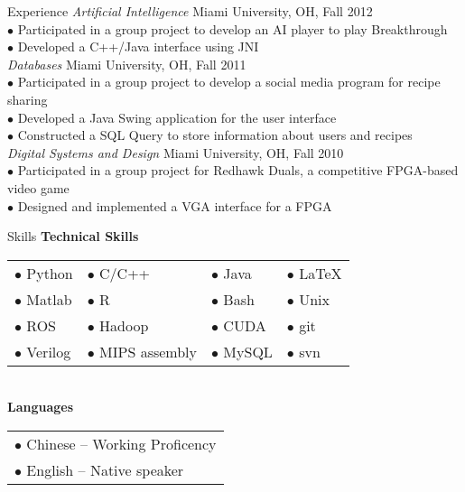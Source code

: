 \documentclass{resume} %
\begin{document}
\begin{rSection}{Experience}
  \textit{Artificial Intelligence} \hfill Miami University, OH, Fall 2012\\
  $\bullet$ Participated in a group project to develop an AI player to play Breakthrough\\
  $\bullet$ Developed a C++/Java interface using JNI\\ 
  \textit{Databases} \hfill Miami University, OH, Fall 2011\\
  $\bullet$ Participated in a group project to develop a social media program for recipe sharing \\
  $\bullet$ Developed a Java Swing application for the user interface \\
  $\bullet$ Constructed a SQL Query to store information about users and recipes\\[1 mm]
  \textit{Digital Systems and Design} \hfill Miami University, OH, Fall 2010\\
  $\bullet$ Participated in a group project for Redhawk Duals, a competitive FPGA-based video game\\
  $\bullet$ Designed and implemented a VGA interface for a FPGA\newpage
\end{rSection}
\begin{rSection}{Skills}
  \textbf{Technical Skills}\\[1 mm]
  \begin{tabular}{llll}
     $\bullet$ Python   &  $\bullet$ C/C++         &  $\bullet$ Java   &   $\bullet$ \LaTeX\\
     $\bullet$ Matlab   &  $\bullet$ R             &  $\bullet$ Bash   &   $\bullet$ Unix \\ 
     $\bullet$ ROS      &  $\bullet$ Hadoop        &  $\bullet$ CUDA   &   $\bullet$ git\\
     $\bullet$ Verilog  &  $\bullet$ MIPS assembly &  $\bullet$ MySQL  &   $\bullet$ svn\\
  \end{tabular}\\[1 mm]
  \textbf{Languages}\\[1 mm]
  \begin{tabular}{l}
    $\bullet$ Chinese --  Working Proficency\\
    $\bullet$ English --  Native speaker
  \end{tabular}
\end{rSection}
\end{document}
